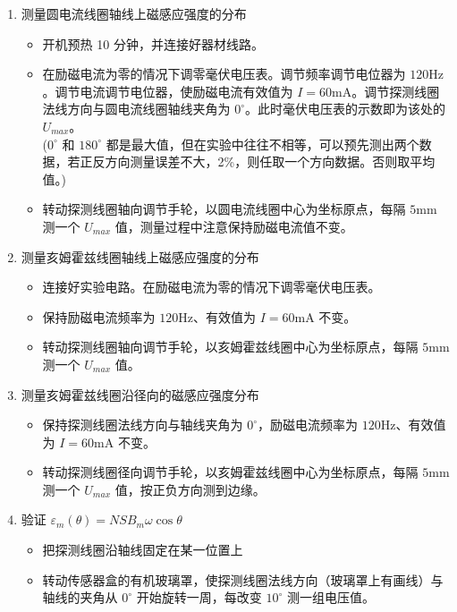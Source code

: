 \documentclass[11pt]{article}
\begin{document}
\begin{enumerate}
    \item 测量圆电流线圈轴线上磁感应强度的分布
    \begin{itemize}
        \item 开机预热 10 分钟，并连接好器材线路。
        \item 在励磁电流为零的情况下调零毫伏电压表。调节频率调节电位器为 $120\text{Hz}$。调节电流调节电位器，使励磁电流有效值为 $I=60\text{mA}$。调节探测线圈法线方向与圆电流线圈轴线夹角为 $0^\circ$。此时毫伏电压表的示数即为该处的 $U_{max}$。\\
        ($0^\circ$ 和 $180^\circ$ 都是最大值，但在实验中往往不相等，可以预先测出两个数据，若正反方向测量误差不大，2\%，则任取一个方向数据。否则取平均值。)
        \item 转动探测线圈轴向调节手轮，以圆电流线圈中心为坐标原点，每隔 $5\text{mm}$ 测一个 $U_{max}$ 值，测量过程中注意保持励磁电流值不变。
    \end{itemize}

    \item 测量亥姆霍兹线圈轴线上磁感应强度的分布
    \begin{itemize}
        \item 连接好实验电路。在励磁电流为零的情况下调零毫伏电压表。
        \item 保持励磁电流频率为 $120\text{Hz}$、有效值为 $I=60\text{mA}$ 不变。
        \item 转动探测线圈轴向调节手轮，以亥姆霍兹线圈中心为坐标原点，每隔 $5\text{mm}$ 测一个 $U_{max}$ 值。
    \end{itemize}

    \item 测量亥姆霍兹线圈沿径向的磁感应强度分布
    \begin{itemize}
        \item 保持探测线圈法线方向与轴线夹角为 $0^\circ$，励磁电流频率为 $120\text{Hz}$、有效值为 $I=60\text{mA}$ 不变。
        \item 转动探测线圈径向调节手轮，以亥姆霍兹线圈中心为坐标原点，每隔 $5\text{mm}$ 测一个 $U_{max}$ 值，按正负方向测到边缘。
    \end{itemize}

    \item 验证 $\varepsilon_m(\theta) = N S B_m \omega \cos\theta$
    \begin{itemize}
        \item 把探测线圈沿轴线固定在某一位置上
        \item 转动传感器盒的有机玻璃罩，使探测线圈法线方向（玻璃罩上有画线）与轴线的夹角从 $0^\circ$ 开始旋转一周，每改变 $10^\circ$ 测一组电压值。
    \end{itemize}


\end{enumerate}
\end{document}
